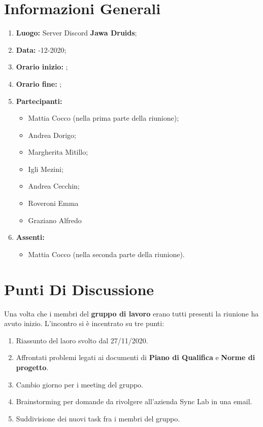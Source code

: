 \newpage
	\section{Informazioni Generali}
	\begin{enumerate}
		\item \textbf{Luogo:} \normalfont Server Discord \textbf{Jawa Druids};
		\item \textbf{Data:} -12-2020;
		\item \textbf{Orario inizio:} ;
		\item \textbf{Orario fine:} ;
		\item \textbf{Partecipanti:}
		\begin{itemize}
			\item Mattia Cocco (nella prima parte della riunione); 
			\item Andrea Dorigo;
			\item Margherita Mitillo;
			\item Igli Mezini;
			\item Andrea Cecchin;
			\item Roveroni Emma
			\item Graziano Alfredo\
		\end{itemize}
		\item \textbf{Assenti:}
		\begin{itemize}
			\item Mattia Cocco (nella seconda parte della riunione).
		\end{itemize}
	\end{enumerate}
	
	\section{Punti Di Discussione}
	Una volta che i membri del \textbf{gruppo di lavoro} erano tutti presenti la riunione ha avuto inizio.
	L'incontro si è incentrato su tre punti:
	\begin{enumerate}
		\item Riassunto del laoro svolto dal 27/11/2020.
		
		\item Affrontati problemi legati ai documenti di \textbf{Piano di Qualifica} e \textbf{Norme di progetto}.
		
		\item Cambio giorno per i meeting del gruppo.
		
		\item Brainstorming per domande da rivolgere all'azienda Sync Lab in una email.
		
		\item Suddivisione dei nuovi task fra i membri del gruppo.
	\end{enumerate}
